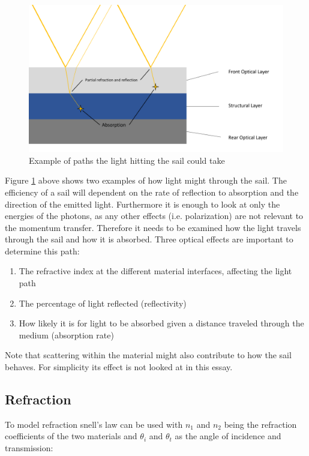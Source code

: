 \documentclass[14pt]{article}
\begin{document}
\begin{figure}[H]
  \includegraphics[width=14cm]{./resources/complicated_path.png}
  \caption{Example of paths the light hitting the sail could take}
  \label{fig:complicated_path}
\end{figure}

Figure \ref{fig:complicated_path} above shows two examples of how light might through the sail. The efficiency of a sail
will dependent on the rate of reflection to absorption and the direction of the emitted light. Furthermore it is enough to look
at only the energies of the photons, as any other effects (i.e. polarization) are not relevant to the momentum transfer. Therefore
it needs to be examined how the light travels through the sail and how it is absorbed.
Three optical effects are important to determine this path:
\begin{enumerate}
  \item The refractive index at the different material interfaces, affecting the light path
  \item The percentage of light reflected (reflectivity)
  \item How likely it is for light to be absorbed given a distance traveled through the medium (absorption rate)
\end{enumerate}

Note that scattering within the material might also contribute to how the sail behaves. For simplicity its effect is
not looked at in this essay.

\subsection{Refraction}

To model refraction snell's law can be used with $n_1$ and $n_2$ being the refraction coefficients of the two materials
and $\theta_i$ and $\theta_t$ as the angle of incidence and transmission\autocite{Hecht2016-pd}:
\end{document}
